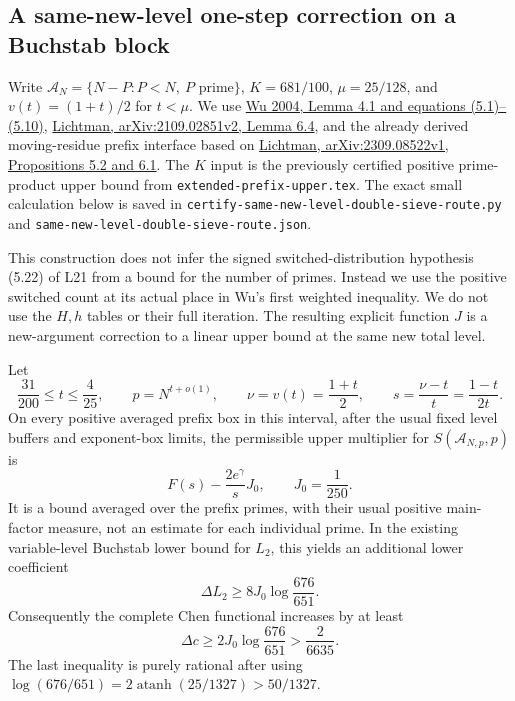 
\subsection{A same-new-level one-step correction on a Buchstab block}
\label{sec:same-new-level-double-sieve-route}

Write $\mathcal A_N=\{N-P:P<N,\ P\text{ prime}\}$,
$K=681/100$, $\mu=25/128$, and $v(t)=(1+t)/2$ for $t<\mu$.
We use
\href{https://www.impan.pl/shop/en/publication/transaction/download/product/82961}
{Wu 2004, Lemma 4.1 and equations (5.1)--(5.10)},
\href{https://arxiv.org/html/2109.02851v2}
{Lichtman, arXiv:2109.02851v2, Lemma 6.4},
and the already derived moving-residue prefix interface based on
\href{https://arxiv.org/html/2309.08522v1}
{Lichtman, arXiv:2309.08522v1, Propositions 5.2 and 6.1}.
The $K$ input is the previously certified positive prime-product upper
bound from \texttt{extended-prefix-upper.tex}. The exact small
calculation below is saved in
\texttt{certify-same-new-level-double-sieve-route.py} and
\texttt{same-new-level-double-sieve-route.json}.

This construction does not infer the signed switched-distribution
hypothesis (5.22) of L21 from a bound for the number of primes. Instead
we use the positive switched count at its actual place in Wu's first
weighted inequality. We do not use the $H,h$ tables or their full
iteration. The resulting explicit function $J$ is a new-argument
correction to a linear upper bound at the same new total level.

\begin{proposition}
\label{prop:same-new-level-one-step}
Let
\[
 \frac{31}{200}\le t\le\frac4{25},\qquad
 p=N^{t+o(1)},\qquad \nu=v(t)=\frac{1+t}{2},\qquad
 s=\frac{\nu-t}{t}=\frac{1-t}{2t}.
\]
On every positive averaged prefix box in this interval, after the
usual fixed level buffers and exponent-box limits, the permissible
upper multiplier for $S(\mathcal A_{N,p},p)$ is
\begin{equation}\label{eq:same-new-one-step-upper}
 F(s)-\frac{2e^\gamma}{s}J_0,\qquad J_0=\frac1{250}.
\end{equation}
It is a bound averaged over the prefix primes, with their usual
positive main-factor measure, not an estimate for each individual
prime. In the existing variable-level Buchstab lower bound for $L_2$,
this yields an additional lower coefficient
\begin{equation}\label{eq:same-new-one-step-L2}
 \Delta L_2\ge8J_0\log\frac{676}{651}.
\end{equation}
Consequently the complete Chen functional increases by at least
\begin{equation}\label{eq:same-new-one-step-Chen}
 \Delta c\ge2J_0\log\frac{676}{651}>
 \frac2{6635}.
\end{equation}
The last inequality is purely rational after using
$\log(676/651)=2\operatorname{atanh}(25/1327)>50/1327$.
\end{proposition}


